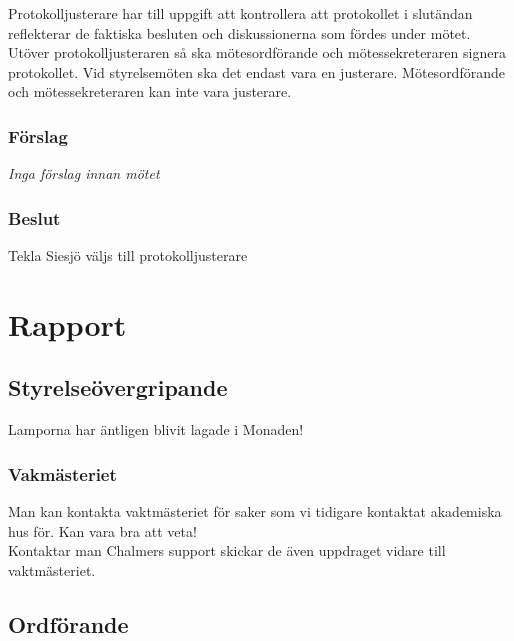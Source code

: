 \documentclass[protokoll]{dvd}
\begin{document}
        Protokolljusterare har till uppgift att kontrollera att protokollet i slutändan reflekterar de faktiska besluten och diskussionerna som fördes under mötet.
        Utöver protokolljusteraren så ska mötesordförande och mötessekreteraren signera protokollet.
        Vid styrelsemöten ska det endast vara en justerare.
        Mötesordförande och mötessekreteraren kan inte vara justerare.

        \subsubsection*{Förslag}
            \begin{attsatser}
                \item \emph{Inga förslag innan mötet}
            \end{attsatser}

        \subsubsection*{Beslut}
            \begin{attsatser}
                \item Tekla Siesjö väljs till protokolljusterare
            \end{attsatser}


\newpage

\newpage

\section{Rapport}
   \subsection*{Styrelseövergripande}
    Lamporna har äntligen blivit lagade i Monaden!

    \subsubsection*{Vakmästeriet}
    Man kan kontakta vaktmästeriet för saker som vi tidigare kontaktat akademiska hus för. Kan vara bra att veta! \\
    Kontaktar man Chalmers support skickar de även uppdraget vidare till vaktmästeriet.

   \subsection*{Ordförande} 
\end{document}
